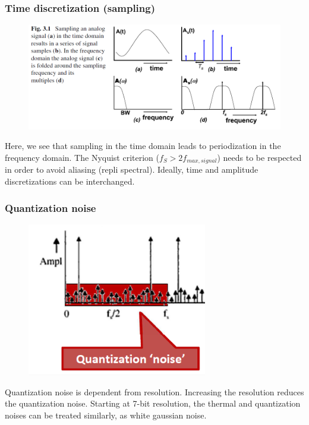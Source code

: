 \subsubsection{Time discretization (sampling)}

\begin{minipage}[c]{0.45 \linewidth}
\begin{figure}[H]
    \centering
    \includegraphics[width =  \textwidth]{L5/img/sampling.PNG}
\end{figure}
\end{minipage}\hfill
\begin{minipage}[c]{0.45 \linewidth}
Here, we see that sampling in the time domain leads to periodization in the frequency domain. The Nyquist criterion ($f_{S} > 2 f_{max,signal}$) needs to be respected in order to avoid aliasing (repli spectral).
Ideally, time and amplitude discretizations can
be interchanged.
\end{minipage}

\subsubsection{Quantization noise}

\begin{minipage}[l]{0.4 \linewidth}
\begin{figure}[H]
    \centering
    \includegraphics[width =  0.7\textwidth]{L5/img/quantization-noise.PNG}
\end{figure}
\end{minipage}\hfill
\begin{minipage}[c]{0.52 \linewidth}
Quantization noise is dependent from resolution. Increasing the resolution reduces the quantization noise.
Starting at 7-bit resolution, the thermal and quantization noises can be treated similarly, as white gaussian noise.
\end{minipage}

